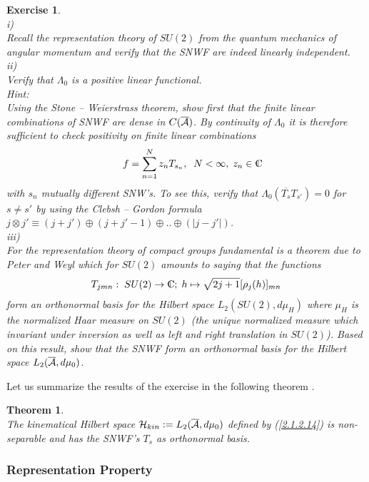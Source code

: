 \documentclass[12pt]{report}
\newtheorem{Theorem}{Theorem}[section]
\newtheorem{Exercise}{Exercise}[section]
\def\be{\begin{equation}}
\def\ee{\end{equation}}
\def\a{{\cal A}}
\def\ab{\overline{\a}}
\def\Cl{{\mathchoice
{\setbox0=\hbox{$\displaystyle\rm C$}\hbox{\hbox to0pt
{\kern0.4\wd0\vrule height0.9\ht0\hss}\box0}}
{\setbox0=\hbox{$\textstyle\rm C$}\hbox{\hbox to0pt
{\kern0.4\wd0\vrule height0.9\ht0\hss}\box0}}
{\setbox0=\hbox{$\scriptstyle\rm C$}\hbox{\hbox to0pt
{\kern0.4\wd0\vrule height0.9\ht0\hss}\box0}}
{\setbox0=\hbox{$\scriptscriptstyle\rm C$}\hbox{\hbox to0pt
{\kern0.4\wd0\vrule height0.9\ht0\hss}\box0}}}}
\begin{document}
\begin{Exercise} \label{ex2.1.2.4} ~~~~~\\
i)\\
Recall the representation theory of $SU(2)$ from the quantum mechanics of 
angular momentum and verify that the SNWF are indeed linearly 
independent.\\
ii)\\
Verify that $\Lambda_0$ is a positive linear functional.\\
Hint:\\
Using the Stone -- Weierstrass theorem, show first that the finite linear
combinations of SNWF are dense in $C(\ab)$. By continuity of $\Lambda_0$ 
it is therefore sufficient to check positivity on finite linear 
combinations 
\be \label{2.1.2.15} ~~~~~\\
f=\sum_{n=1}^N z_n T_{s_n},\;\;N<\infty,\;z_n\in\Cl
\ee
with $s_n$ mutually different SNW's. To see this, verify that 
$\Lambda_0(\overline{T_s} T_{s'})=0$ for $s\not=s'$ by using the 
Clebsh -- Gordon formula $j\otimes j'\equiv (j+j')\oplus (j+j'-1)\oplus ..
\oplus (|j-j'|)$.\\
iii)\\
For the representation theory of compact groups fundamental is a theorem 
due to Peter and Weyl \cite{35} which for $SU(2)$ amounts to saying that 
the functions 
\be \label{2.1.2.16}
T_{jmn}:\;SU(2)\to \Cl;\;h\mapsto \sqrt{2j+1} [\rho_j(h)]_{mn}
\ee
form an orthonormal basis for the Hilbert space $L_2(SU(2),d\mu_H)$
where $\mu_H$ is the normalized Haar measure on $SU(2)$ (the unique
normalized 
measure which invariant under inversion as well as left and right 
translation in $SU(2)$).
Based on this result, show that the SNWF form an orthonormal basis 
for the Hilbert space $L_2(\ab,d\mu_0)$.
\end{Exercise}
%
Let us summarize the results of the exercise in the following 
theorem \cite{34}.
%
\begin{Theorem}
\label{th2.1.2.2} 
~~~~~\\ The kinematical Hilbert space ${\cal H}_{kin}:=L_2(\ab,d\mu_0)$ 
defined by (\ref{2.1.2.14}) is non-separable and has the SNWF's
$T_s$ as orthonormal basis.
\end{Theorem}
%


\subsubsection{Representation Property}
\label{s2.1.2.4}
\end{document}

